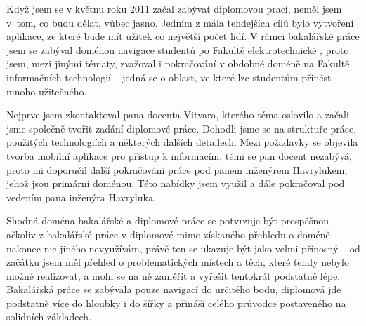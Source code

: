 \begin{introduction}
Když jsem se v květnu roku 2011 začal zabývat diplomovou prací, neměl jsem v~tom, co budu dělat, vůbec jasno. Jedním z mála tehdejších cílů bylo vytvoření aplikace, ze které bude mít užitek co největší počet lidí. V rámci bakalářské práce jsem se zabýval doménou navigace studentů po Fakultě elektrotechnické  \cite{Bakalarka}, proto jsem, mezi jinými tématy, zvažoval i pokračování v obdobné doméně na Fakultě informačních technologií -- jedná se o oblast, ve které lze studentům přinést mnoho užitečného.

Nejprve jsem zkontaktoval pana docenta Vitvara, kterého téma oslovilo a začali jsme společně tvořit zadání diplomové práce. Dohodli jsme se na struktuře práce, použitých technologiích a některých dalších detailech. Mezi požadavky se objevila tvorba mobilní aplikace pro přístup k informacím, těmi se pan docent nezabývá, proto mi doporučil další pokračování práce pod panem inženýrem Havrylukem, jehož jsou primární doménou. Této nabídky jsem využil a dále pokračoval pod vedením pana inženýra Havryluka.

Shodná doména bakalářské a diplomové práce se potvrzuje být prospěšnou -- ačkoliv z bakalářské práce v diplomové mimo získaného přehledu o doméně nakonec nic jiného nevyužívám, právě ten se ukazuje být jako velmi přínosný -- od začátku jsem měl přehled o problematických místech a těch, které tehdy nebylo možné realizovat, a mohl se na ně zaměřit a vyřešit tentokrát podstatně lépe. Bakalářská práce se zabývala pouze navigací do určitého bodu, diplomová jde podstatně více do hloubky i do šířky a přináší celého průvodce postaveného na solidních základech.
\end{introduction}

